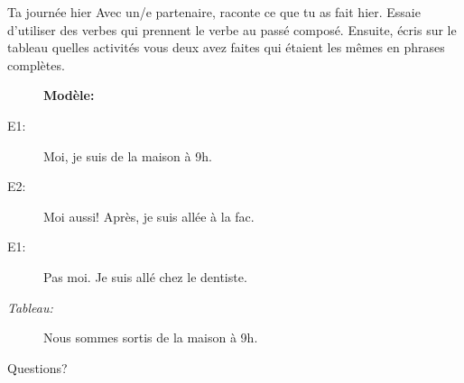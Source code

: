 \documentclass{beamer}
\begin{document}
  \begin{frame}{Ta journée hier}
    Avec un/e partenaire, raconte ce que tu as fait hier.
    Essaie d'utiliser des verbes qui prennent le verbe  au passé composé.
    Ensuite, écris sur le tableau quelles activités vous deux avez faites qui étaient les mêmes en phrases complètes. \\
    \begin{description}
      \item[] \textbf{Modèle:}
      \item[E1:] Moi, je suis de la maison à 9h.
      \item[E2:] Moi aussi! Après, je suis allée à la fac.
      \item[E1:] Pas moi. Je suis allé chez le dentiste.
      \item[\emph{Tableau:}] Nous sommes sortis de la maison à 9h.
    \end{description}
  \end{frame}


  \begin{frame}{}
    \begin{center}
      \Large Questions?
    \end{center}
  \end{frame}
\end{document}
